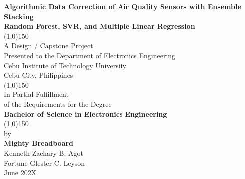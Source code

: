 \thispagestyle{empty}
     \begin{center}
     \textbf{Algorithmic Data Correction of Air Quality Sensors with Ensemble Stacking  \\
     Random Forest, SVR, and Multiple Linear Regression} \\
     \vspace{0.7cm}
     \line(1,0){150}\\
     \vspace{0.7cm}
     A Design / Capstone Project\\
     Presented to the Department of Electronics Engineering\\
     Cebu Institute of Technology University\\
     Cebu City, Philippines\\
     \vspace{0.7cm}
     \line(1,0){150}\\
     \vspace{0.7cm}
     In Partial Fulfillment\\
     of the Requirements for the Degree\\
     \textbf{Bachelor of Science in Electronics Engineering}\\ 
     \vspace{0.7cm}
     \line(1,0){150}\\
     \vspace{0.7cm}
     by \\
     \textbf{Mighty Breadboard }\\
     Kenneth Zachary B. Agot\\
     Fortune Glester C. Leyson\\
     \vspace{1.5cm}
     June 202X
     \end{center}
     